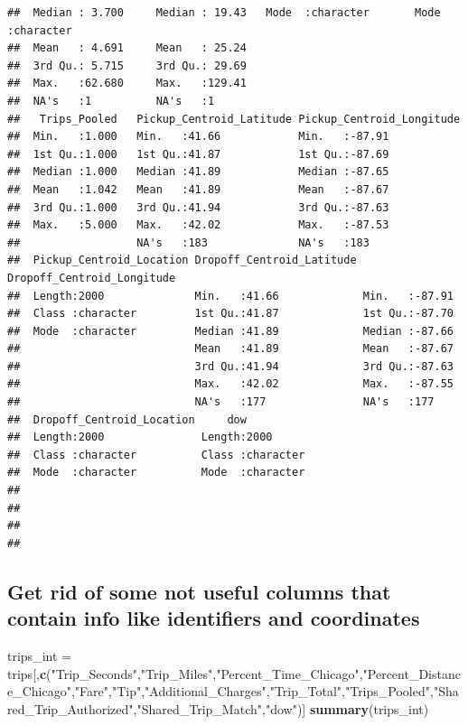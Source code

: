 \documentclass[
]{article}
\newenvironment{Shaded}{\begin{snugshade}}{\end{snugshade}}
\newcommand{\FunctionTok}[1]{\textcolor[rgb]{0.13,0.29,0.53}{\textbf{#1}}}
\newcommand{\NormalTok}[1]{#1}
\newcommand{\OtherTok}[1]{\textcolor[rgb]{0.56,0.35,0.01}{#1}}
\newcommand{\StringTok}[1]{\textcolor[rgb]{0.31,0.60,0.02}{#1}}
\begin{document}
\begin{verbatim}
##  Median : 3.700     Median : 19.43   Mode  :character       Mode  :character  
##  Mean   : 4.691     Mean   : 25.24                                            
##  3rd Qu.: 5.715     3rd Qu.: 29.69                                            
##  Max.   :62.680     Max.   :129.41                                            
##  NA's   :1          NA's   :1                                                 
##   Trips_Pooled   Pickup_Centroid_Latitude Pickup_Centroid_Longitude
##  Min.   :1.000   Min.   :41.66            Min.   :-87.91           
##  1st Qu.:1.000   1st Qu.:41.87            1st Qu.:-87.69           
##  Median :1.000   Median :41.89            Median :-87.65           
##  Mean   :1.042   Mean   :41.89            Mean   :-87.67           
##  3rd Qu.:1.000   3rd Qu.:41.94            3rd Qu.:-87.63           
##  Max.   :5.000   Max.   :42.02            Max.   :-87.53           
##                  NA's   :183              NA's   :183              
##  Pickup_Centroid_Location Dropoff_Centroid_Latitude Dropoff_Centroid_Longitude
##  Length:2000              Min.   :41.66             Min.   :-87.91            
##  Class :character         1st Qu.:41.87             1st Qu.:-87.70            
##  Mode  :character         Median :41.89             Median :-87.66            
##                           Mean   :41.89             Mean   :-87.67            
##                           3rd Qu.:41.94             3rd Qu.:-87.63            
##                           Max.   :42.02             Max.   :-87.55            
##                           NA's   :177               NA's   :177               
##  Dropoff_Centroid_Location     dow           
##  Length:2000               Length:2000       
##  Class :character          Class :character  
##  Mode  :character          Mode  :character  
##                                              
##                                              
##                                              
## 
\end{verbatim}

\subsection{Get rid of some not useful columns that contain info like
identifiers and
coordinates}\label{get-rid-of-some-not-useful-columns-that-contain-info-like-identifiers-and-coordinates}

\begin{Shaded}
\begin{Highlighting}[]
\NormalTok{trips\_int }\OtherTok{=}\NormalTok{ trips[,}\FunctionTok{c}\NormalTok{(}\StringTok{"Trip\_Seconds"}\NormalTok{,}\StringTok{"Trip\_Miles"}\NormalTok{,}\StringTok{"Percent\_Time\_Chicago"}\NormalTok{,}\StringTok{"Percent\_Distance\_Chicago"}\NormalTok{,}\StringTok{"Fare"}\NormalTok{,}\StringTok{"Tip"}\NormalTok{,}\StringTok{"Additional\_Charges"}\NormalTok{,}\StringTok{"Trip\_Total"}\NormalTok{,}\StringTok{"Trips\_Pooled"}\NormalTok{,}\StringTok{"Shared\_Trip\_Authorized"}\NormalTok{,}\StringTok{"Shared\_Trip\_Match"}\NormalTok{,}\StringTok{"dow"}\NormalTok{)]}
\FunctionTok{summary}\NormalTok{(trips\_int)}
\end{Highlighting}
\end{Shaded}
\end{document}
